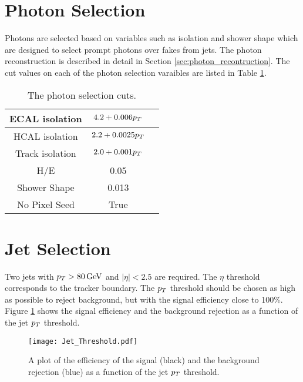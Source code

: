 \section{Photon Selection}

Photons are selected based on variables such as isolation and shower shape which
are designed to select prompt photons over fakes from jets. The photon 
reconstruction is described in detail in Section \ref{sec:photon_recontruction}. 
The cut values on each of the photon selection varaibles are listed in Table 
\ref{tab:photoncuts}. 

\begin{table}
\begin{center}
\begin{tabular}{|c|c|c|}
\hline
ECAL isolation & $4.2 + 0.006p_{T}$ \\
\hline
HCAL isolation & $2.2 + 0.0025p_{T}$ \\
\hline
Track isolation & $2.0 + 0.001p_{T}$ \\
\hline
H/E & 0.05 \\
\hline
Shower Shape & 0.013 \\
\hline
No Pixel Seed & True \\
\hline
\end{tabular}
\end{center}
\caption{The photon selection cuts.}
\label{tab:photoncuts}
\end{table}

\section{Jet Selection}

Two jets with $p_{T} > 80 \, \mathrm{GeV}$ and $|\eta| < 2.5$ are required. The $\eta$
threshold corresponds to the tracker boundary. The $p_{T}$ threshold should be
chosen as high as possible to reject background, but with the signal efficiency
close to 100\%. Figure \ref{fig:Jet_Threshold} shows the signal efficiency and 
the background rejection as a function of the jet $p_{T}$ threshold. 

\begin{figure}
\begin{center}
\texttt{[image: Jet\_Threshold.pdf]}
\end{center}
\caption{A plot of the efficiency of the signal (black) and the background
rejection (blue) as a function of the jet $p_{T}$ threshold.}
\label{fig:Jet_Threshold}
\end{figure}

